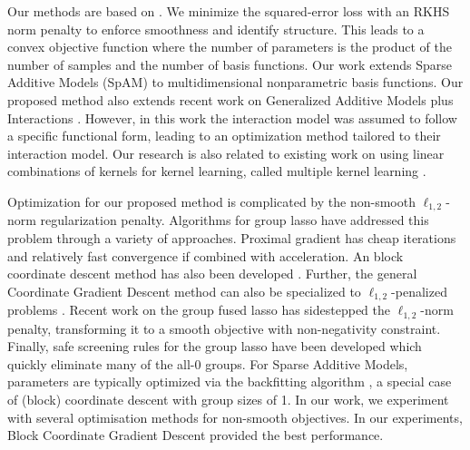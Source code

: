 Our methods are based on \krr.
We minimize the squared-error loss with 
an RKHS norm penalty to enforce smoothness and identify structure.
This leads to a convex objective function where the number of parameters is
the product of the number of samples and the number of basis functions.
Our work extends Sparse Additive Models (SpAM) \citep{ravikumar09spam} 
to multidimensional nonparametric basis functions.
Our proposed method also extends recent work on 
Generalized Additive Models plus Interactions \citep{intelligible:2013}.
However, in this work the interaction model was assumed to follow a specific functional form,
leading to an optimization method tailored to their interaction model.
Our research is also related to existing work on 
using linear combinations of kernels for kernel learning,
called multiple kernel learning \citep{mkl-review:2011}.

Optimization for our proposed method is complicated by 
the non-smooth $\ell_{1,2}$-norm regularization penalty.
Algorithms for group lasso have addressed this problem 
through a variety of approaches.
Proximal gradient \citep{beck2009fast}
has cheap iterations and relatively fast convergence if combined with acceleration.
An block coordinate descent method has also been developed \citep{bcd-group-lasso:2013}.
Further, the general Coordinate Gradient Descent method \citep{cgd:2009} 
can also be specialized to $\ell_{1,2}$-penalized problems 
\citep{meier2008group,note-group-lasso:2010}.
Recent work \citep{group-fused-lasso:2014} on the group fused lasso 
has sidestepped the $\ell_{1,2}$-norm penalty, transforming it to a 
smooth objective with non-negativity constraint.
Finally, safe screening rules for the group lasso have been developed 
\citep{group-lasso-screening:2013} which quickly eliminate many of the all-0 
groups.
For Sparse Additive Models, parameters are typically 
optimized via the backfitting algorithm \citep{ravikumar09spam}, 
a special case of (block) coordinate descent with group sizes of 1.
In our work, we experiment with several optimisation methods for non-smooth
objectives. In our experiments, Block Coordinate Gradient Descent provided the
best performance.

